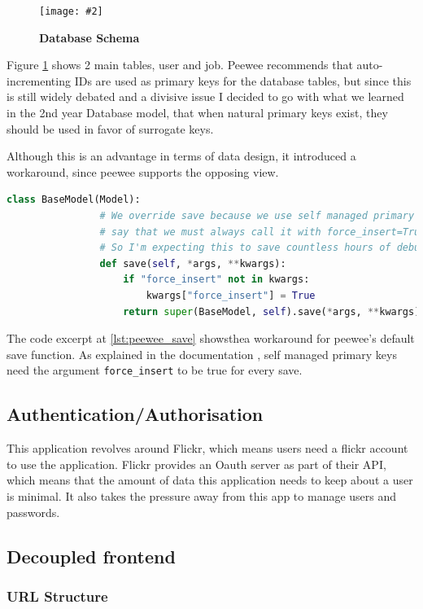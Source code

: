 \documentclass[10pt, a4paper]{article}
\newcommand{\figuremacro}[5]{
\begin{figure}[#1]
\centering
\texttt{[image: \#2]}
\caption[#3]{\textbf{#3}#4}
\label{fig:#2}
\end{figure}
}
\begin{document}
        \figuremacro{h}{db}{Database Schema}{}{0.6}

        Figure \ref{fig:db} shows 2 main tables, user and job. Peewee recommends that auto-incrementing IDs are used as primary keys for the database tables, but since this is still widely debated and a divisive issue \cite{primary_key_choosing} I decided to go with what we learned in the 2nd year Database model, that when natural primary keys exist, they should be used in favor of surrogate keys.

        Although this is an advantage in terms of data design, it introduced a workaround, since peewee supports the opposing view.
        \begin{lstlisting}[label=lst:peewee_save, language = Python, caption = Peewee save function workaround]
        class BaseModel(Model):
    			# We override save because we use self managed primary keys, and peewee docs
    			# say that we must always call it with force_insert=True when that is the case
    			# So I'm expecting this to save countless hours of debugging
    			def save(self, *args, **kwargs):
    			    if "force_insert" not in kwargs:
    			        kwargs["force_insert"] = True
    			    return super(BaseModel, self).save(*args, **kwargs)
        \end{lstlisting}
        The code excerpt at \ref{lst:peewee_save} showsthea workaround for peewee's default save function. As explained in the documentation \cite{peewee_pkeys}, self managed primary keys need the argument \texttt{force\_insert} to be true for every save.


        \subsection{Authentication/Authorisation}

        This application revolves around Flickr, which means users need a flickr account to use the application. Flickr provides an Oauth \cite{oauth} server as part of their API, which means that the amount of data this application needs to keep about a user is minimal. It also takes the pressure away from this app to manage users and passwords.

        \subsection{Decoupled frontend}


        \subsubsection{URL Structure}
\end{document}
